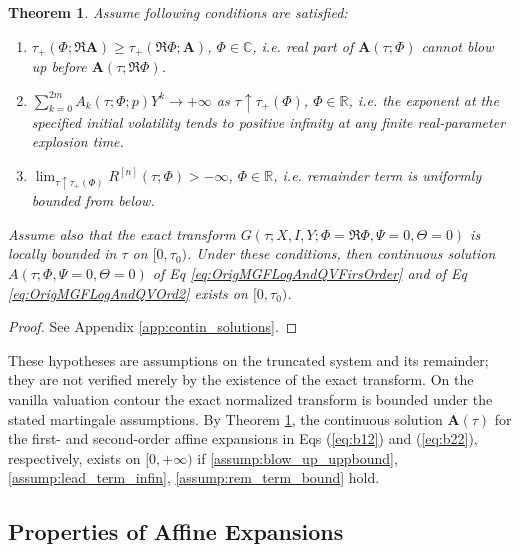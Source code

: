 \documentclass[11pt,a4paper] {article}
\newtheorem{theorem}{Theorem}[section]
\begin{document}
\begin{theorem}\label{thm:contin_solutions}
Assume following conditions are satisfied:
\begin{enumerate}%
\item \label{assump:blow_up_uppbound}  $\tau_+(\Phi;\Re \mathbf{A})\ge \tau_+(\Re \Phi; \mathbf{A})$, $\Phi\in \mathbb{C}$, i.e. real part of  $\mathbf{A}(\tau;\Phi)$ cannot blow up before $\mathbf{A}(\tau;\Re\Phi)$.

\item \label{assump:lead_term_infin} $\sum_{k=0}^{2m} A_k(\tau;\Phi;p)Y^k \to +\infty$ as $\tau\uparrow \tau_+(\Phi)$, $\Phi\in \mathbb{R}$, i.e. the exponent at the specified initial volatility tends to positive infinity at any finite real-parameter explosion time.

\item \label{assump:rem_term_bound} $\lim_{\tau\uparrow \tau_+(\Phi)}R^{[n]}(\tau;\Phi)>-\infty$, $\Phi\in \mathbb{R}$, i.e. remainder term is uniformly bounded from below.
\end{enumerate}

Assume also that the exact transform $G(\tau;X,I,Y;\Phi=\Re\Phi,\Psi=0,\Theta=0)$ is locally bounded in $\tau$ on $[0,\tau_0)$. Under these conditions,
then continuous solution $A(\tau;\Phi,\Psi=0,\Theta=0)$ of Eq \eqref{eq:OrigMGFLogAndQVFirsOrder} and of Eq \eqref{eq:OrigMGFLogAndQVOrd2} exists on $[0,\tau_0)$.
\end{theorem}

\begin{proof}
See Appendix \ref{app:contin_solutions}.
\end{proof}

These hypotheses are assumptions on the truncated system and its remainder; they are not verified merely by the existence of the exact transform. On the vanilla valuation contour the exact normalized transform is bounded under the stated martingale assumptions. By Theorem \ref{thm:contin_solutions}, the continuous solution $\mathbf{A}(\tau)$ for the first- and second-order affine expansions in Eqs (\ref{eq:b12}) and (\ref{eq:b22}), respectively, exists on $[0, +\infty)$ if \ref{assump:blow_up_uppbound}, \ref{assump:lead_term_infin}, \ref{assump:rem_term_bound} hold.



\subsection{Properties of Affine Expansions}
\end{document}

